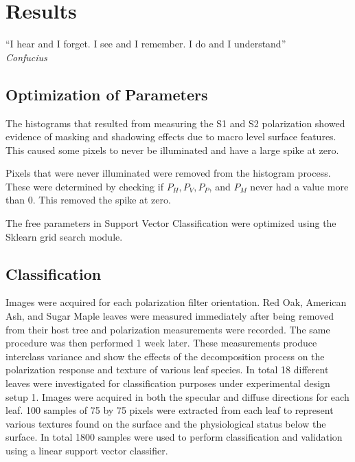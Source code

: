 \chapter{Results}
%
\begin{center}
  \begin{minipage}{0.75\textwidth}
    \begin{small}
      “I hear and I forget. I see and I remember. I do and I understand”\\
      \null\hfill\emph{Confucius}
    \end{small}
  \end{minipage}
  \vspace{0.5cm}
\end{center}
\section{Optimization of Parameters}
The histograms that resulted from measuring the S1 and S2 polarization showed evidence of masking and shadowing effects due to macro level surface features.  This caused some pixels to never be illuminated and have a large spike at zero.

Pixels that were never illuminated were removed from the histogram process. These were determined by checking if $P_H, P_V, P_P$, and $P_M$ never had a value more than 0.  This removed the spike at zero.

The free parameters in Support Vector Classification were optimized using the Sklearn grid search module.

\section{Classification}
Images were acquired for each polarization filter orientation. Red Oak, American Ash, and Sugar Maple leaves were measured immediately after being removed from their host tree and polarization measurements were recorded.  The same procedure was then performed 1 week later.  These measurements produce interclass variance and show the effects of the decomposition process on the polarization response and texture of various leaf species.  In total 18 different leaves were investigated for classification purposes under experimental design setup 1.  Images were acquired in both the specular and diffuse directions for each leaf.  100 samples of 75 by 75 pixels were extracted from each leaf to represent various textures found on the surface and the physiological status below the surface.  In total 1800 samples were used to perform classification and validation using a linear support vector classifier.
